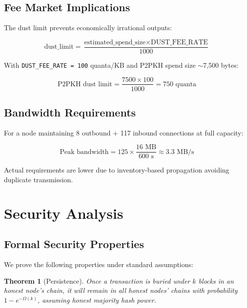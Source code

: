 \documentclass[11pt,a4paper]{article}
\newtheorem{theorem}{Theorem}
\begin{document}
\subsection{Fee Market Implications}

The dust limit prevents economically irrational outputs:

\begin{equation}
\text{dust\_limit} = \frac{\text{estimated\_spend\_size} \times \text{DUST\_FEE\_RATE}}{1000}
\end{equation}

With \texttt{DUST\_FEE\_RATE = 100} quanta/KB and P2PKH spend size $\sim$7,500 bytes:

\begin{equation}
\text{P2PKH dust limit} = \frac{7500 \times 100}{1000} = 750 \text{ quanta}
\end{equation}

\subsection{Bandwidth Requirements}

For a node maintaining 8 outbound + 117 inbound connections at full capacity:

\begin{equation}
\text{Peak bandwidth} = 125 \times \frac{16 \text{ MB}}{600 \text{ s}} \approx 3.3 \text{ MB/s}
\end{equation}

Actual requirements are lower due to inventory-based propagation avoiding duplicate transmission.

\section{Security Analysis}

\subsection{Formal Security Properties}

We prove the following properties under standard assumptions:

\begin{theorem}[Persistence]
Once a transaction is buried under $k$ blocks in an honest node's chain, it will remain in all honest nodes' chains with probability $1 - e^{-\Omega(k)}$, assuming honest majority hash power.
\end{theorem}
\end{document}
